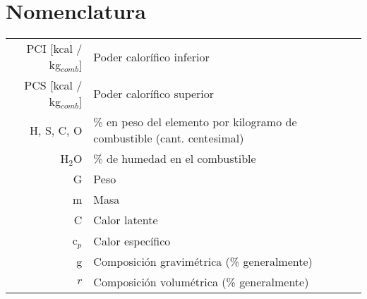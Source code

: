 \documentclass[11pt,a4paper]{article}
\begin{document}
	\pagestyle{pieyencabezado}
	
	\section*{Nomenclatura}
	\begin{tabular}{r l}
		PCI [kcal / kg$_{comb}$] & Poder calorífico inferior \\
		PCS [kcal / kg$_{comb}$] & Poder calorífico superior \\
		H, S, C, O & \% en peso del elemento por kilogramo de combustible (cant. centesimal)\\
		H$_2$O & \% de humedad en el combustible \\
		G & Peso\\
		m & Masa\\
		C & Calor latente\\
		c$_p$ & Calor específico\\
		g & Composición gravimétrica (\% generalmente)\\
		$r$ & Composición volumétrica (\% generalmente)\\
	\end{tabular}

	
\end{document}
